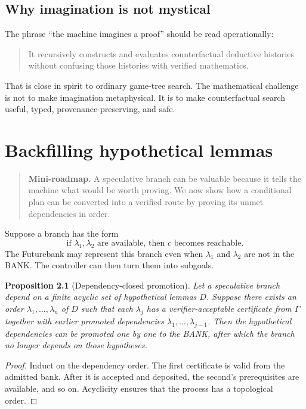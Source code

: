 \documentclass[11pt,openany]{book}
\newtheorem{proposition}[theorem]{Proposition}
\theoremstyle{definition}
\theoremstyle{remark}
\newenvironment{miniroadmap}{\begin{quote}\small\color{deepblue}\textbf{Mini-roadmap.} }{\end{quote}}
\begin{document}
\section{Why imagination is not mystical}
The phrase ``the machine imagines a proof'' should be read operationally:
\begin{quote}
It recursively constructs and evaluates counterfactual deductive histories without confusing those histories with verified mathematics.
\end{quote}
That is close in spirit to ordinary game-tree search. The mathematical challenge is not to make imagination metaphysical. It is to make counterfactual search useful, typed, provenance-preserving, and safe.

\chapter{Backfilling hypothetical lemmas}
\begin{miniroadmap}
A speculative branch can be valuable because it tells the machine what would be worth proving. We now show how a conditional plan can be converted into a verified route by proving its unmet dependencies in order.
\end{miniroadmap}

Suppose a branch has the form
\[
\text{if }\lambda_1,\lambda_2\text{ are available, then }c\text{ becomes reachable}.
\]
The Futurebank may represent this branch even when $\lambda_1$ and $\lambda_2$ are not in the BANK. The controller can then turn them into subgoals.

\begin{proposition}[Dependency-closed promotion]\label{prop:backfill}
Let a speculative branch depend on a finite acyclic set of hypothetical lemmas $D$. Suppose there exists an order $\lambda_1,\ldots,\lambda_n$ of $D$ such that each $\lambda_j$ has a verifier-acceptable certificate from $\Gamma$ together with earlier promoted dependencies $\lambda_1,\ldots,\lambda_{j-1}$. Then the hypothetical dependencies can be promoted one by one to the BANK, after which the branch no longer depends on those hypotheses.
\end{proposition}
\begin{proof}
Induct on the dependency order. The first certificate is valid from the admitted bank. After it is accepted and deposited, the second's prerequisites are available, and so on. Acyclicity ensures that the process has a topological order.
\end{proof}
\end{document}
